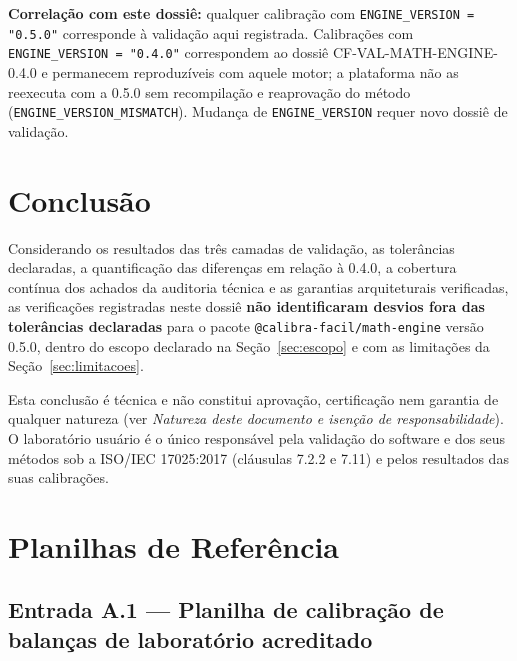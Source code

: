 \documentclass[11pt,a4paper]{article}
\newcommand{\docVersion}{0.5.0}
\newcommand{\previousVersion}{0.4.0}
\begin{document}
\textbf{Correlação com este dossiê:} qualquer calibração com \texttt{ENGINE\_VERSION = "\docVersion"} corresponde à validação aqui registrada. Calibrações com \texttt{ENGINE\_VERSION = "\previousVersion"} correspondem ao dossiê CF-VAL-MATH-ENGINE-0.4.0 e permanecem reproduzíveis com aquele motor; a plataforma não as reexecuta com a \docVersion{} sem recompilação e reaprovação do método (\texttt{ENGINE\_VERSION\_MISMATCH}). Mudança de \texttt{ENGINE\_VERSION} requer novo dossiê de validação.

\section{Conclusão}

Considerando os resultados das três camadas de validação, as tolerâncias declaradas, a quantificação das diferenças em relação à \previousVersion{}, a cobertura contínua dos achados da auditoria técnica e as garantias arquiteturais verificadas, as verificações registradas neste dossiê \textbf{não identificaram desvios fora das tolerâncias declaradas} para o pacote \texttt{@calibra-facil/math-engine} versão \docVersion{}, dentro do escopo declarado na Seção~\ref{sec:escopo} e com as limitações da Seção~\ref{sec:limitacoes}.

Esta conclusão é técnica e não constitui aprovação, certificação nem garantia de qualquer natureza (ver \emph{Natureza deste documento e isenção de responsabilidade}). O laboratório usuário é o único responsável pela validação do software e dos seus métodos sob a ISO/IEC 17025:2017 (cláusulas 7.2.2 e 7.11) e pelos resultados das suas calibrações.

\appendix

\section{Planilhas de Referência}
\label{app:planilhas}

\subsection{Entrada A.1 --- Planilha de calibração de balanças de laboratório acreditado}
\end{document}

